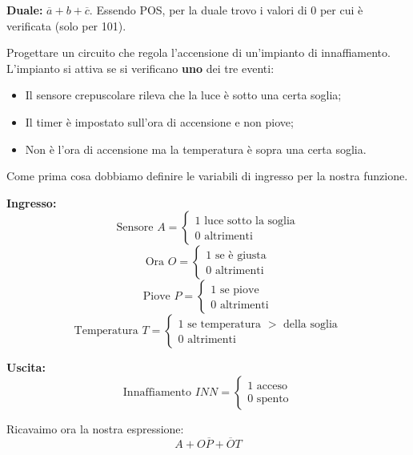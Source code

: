 \begin{exercise}
    \textbf{Duale:} $\overline{a}+b+\overline{c}$. Essendo POS, per la duale trovo i valori di 0 per cui è verificata (solo per 101).
\end{exercise}


\begin{exercise}\label{ex:innaffio}
    Progettare un circuito che regola l'accensione di un'impianto di innaffiamento. L'impianto si attiva se si verificano \textbf{uno} dei tre eventi:
\begin{itemize}
    \item Il sensore crepuscolare rileva che la luce è sotto una certa soglia;
    \item Il timer è impostato sull'ora di accensione e non piove;
    \item Non è l'ora di accensione ma la temperatura è sopra una certa soglia.
\end{itemize}
Come prima cosa dobbiamo definire le variabili di ingresso per la nostra funzione.

\textbf{Ingresso:}
$$
\text{Sensore }A=
\begin{cases}
1 \text{ luce sotto la soglia}\\
0 \text{ altrimenti}
\end{cases}
$$
$$
\text{Ora }O=
\begin{cases}
1 \text{ se è giusta}\\
0 \text{ altrimenti}
\end{cases}
$$
$$
\text{Piove }P=
\begin{cases}
1 \text{ se piove}\\
0 \text{ altrimenti}
\end{cases}
$$
$$
\text{Temperatura }T=
\begin{cases}
1 \text{ se temperatura } > \text{ della soglia}\\
0 \text{ altrimenti}
\end{cases}
$$

\textbf{Uscita:}
$$
\text{Innaffiamento }INN=
\begin{cases}
1 \text{ acceso}\\
0 \text{ spento}
\end{cases}
$$

Ricavaimo ora la nostra espressione:
\begin{equation}\label{eq:innaff}
    A+O\overline{P}+\overline{O}T
\end{equation}


\end{exercise}
